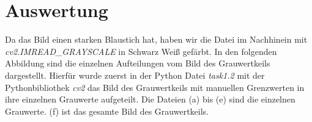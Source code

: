 \documentclass[12pt, oneside, a4paper, \docLanguage]{report}
\begin{document}
\section{Auswertung}
\label{chap:VERSUCH_1_AUSWERTUNG}
Da das Bild einen starken Blaustich hat, haben wir die Datei im Nachhinein mit 
\newline 
\textit{cv2.IMREAD\_GRAYSCALE} in Schwarz Weiß gefärbt.
In den folgenden Abbildung sind die einzelnen Aufteilungen vom Bild des Grauwertkeils dargestellt.
Hierfür wurde zuerst in der Python Datei \textit{task1.2} mit der Pythonbibliothek \textit{cv2} das Bild des Grauwertkeils mit manuellen Grenzwerten in ihre einzelnen Grauwerte aufgeteilt.
Die Dateien (a) bis (e) sind die einzelnen Grauwerte. (f) ist das gesamte Bild des Grauwertkeils.
\begin{figure}[hbt!]
  	\centering

\end{figure}
\end{document}
